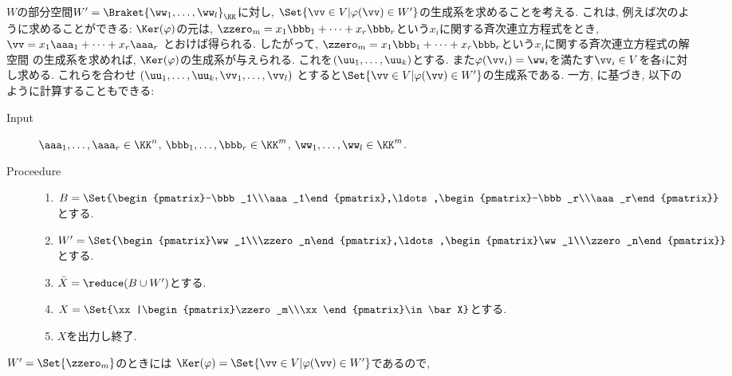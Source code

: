 $W$の部分空間$W'=\Braket{\ww_1,\ldots,\ww_l}_{\KK}$に対し,
$\Set{\vv\in V|\varphi(\vv)\in W'}$の生成系を求めることを考える.
これは, 例えば次のように求めることができる:
$\Ker(\varphi)$の元は,
$\zzero_m=x_1\bbb_1+\cdots+x_r\bbb_r$という$x_i$に関する斉次連立方程式をとき,
$\vv=x_1\aaa_1+\cdots+x_r\aaa_r$
とおけば得られる.
したがって,
$\zzero_m=x_1\bbb_1+\cdots+x_r\bbb_r$という$x_i$に関する斉次連立方程式の解空間
の生成系を求めれば,
$\Ker(\varphi)$の生成系が与えられる.
これを$(\uu_1,\ldots,\uu_k)$とする.
また$\varphi(\vv_i)=\ww_i$を満たす$\vv_i\in V$を各$i$に対し求める.
これらを合わせ
$(\uu_1,\ldots,\uu_k,\vv_1,\ldots,\vv_l)$
とすると$\Set{\vv\in V|\varphi(\vv)\in W'}$の生成系である.
一方,
に基づき,
以下のように計算することもできる:
\begin{algorithm}\makebox{}
\begin{description}
\item[Input]
$\aaa_1,\ldots,\aaa_r\in \KK^n$,
$\bbb_1,\ldots,\bbb_r\in \KK^m$,
$\ww_1,\ldots,\ww_l\in \KK^m$.
\item[Proceedure]\makebox{}
  \begin{enumerate}
  \item $B=\Set{\begin{pmatrix}-\bbb_1\\\aaa_1\end{pmatrix},\ldots,\begin{pmatrix}-\bbb_r\\\aaa_r\end{pmatrix}}$とする.
  \item $W'=\Set{\begin{pmatrix}\ww_1\\\zzero_n\end{pmatrix},\ldots,\begin{pmatrix}\ww_l\\\zzero_n\end{pmatrix}}$とする.
  \item $\bar X=\reduce(B\cup W')$とする.
  \item $X=\Set{\xx|\begin{pmatrix}\zzero_m\\\xx\end{pmatrix}\in \bar X}$とする.
  \item $X$を出力し終了.
  \end{enumerate}
\end{description}
\end{algorithm}
$W'=\Set{\zzero_m}$のときには
$\Ker(\varphi)=\Set{\vv\in V|\varphi(\vv)\in W'}$であるので,
